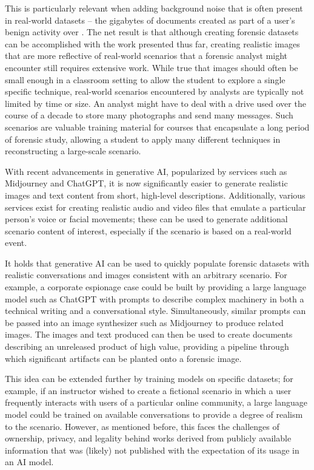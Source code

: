 \documentclass[letterpaper,12pt]{report}
\begin{document}
This is particularly relevant when adding background noise that is often
present in real-world datasets -- the gigabytes of documents created as
part of a user's benign activity over . The net result is that although
creating forensic datasets can be accomplished with the work presented
thus far, creating realistic images that are more reflective of
real-world scenarios that a forensic analyst might encounter still
requires extensive work. While true that images should often be small
enough in a classroom setting to allow the student to explore a single
specific technique, real-world scenarios encountered by analysts are
typically not limited by time or size. An analyst might have to deal
with a drive used over the course of a decade to store many photographs
and send many messages. Such scenarios are valuable training material
for courses that encapsulate a long period of forensic study, allowing a
student to apply many different techniques in reconstructing a
large-scale scenario.

With recent advancements in generative AI, popularized by services such
as Midjourney and ChatGPT, it is now significantly easier to generate
realistic images and text content from short, high-level descriptions.
Additionally, various services exist for creating realistic audio and
video files that emulate a particular person's voice or facial
movements; these can be used to generate additional scenario content of
interest, especially if the scenario is based on a real-world event.

It holds that generative AI can be used to quickly populate forensic
datasets with realistic conversations and images consistent with an
arbitrary scenario. For example, a corporate espionage case could be
built by providing a large language model such as ChatGPT with prompts
to describe complex machinery in both a technical writing and a
conversational style. Simultaneously, similar prompts can be passed into
an image synthesizer such as Midjourney to produce related images. The
images and text produced can then be used to create documents describing
an unreleased product of high value, providing a pipeline through which
significant artifacts can be planted onto a forensic image.

This idea can be extended further by training models on specific
datasets; for example, if an instructor wished to create a fictional
scenario in which a user frequently interacts with users of a particular
online community, a large language model could be trained on available
conversations to provide a degree of realism to the scenario. However,
as mentioned before, this faces the challenges of ownership, privacy,
and legality behind works derived from publicly available information
that was (likely) not published with the expectation of its usage in an
AI model.
\end{document}
